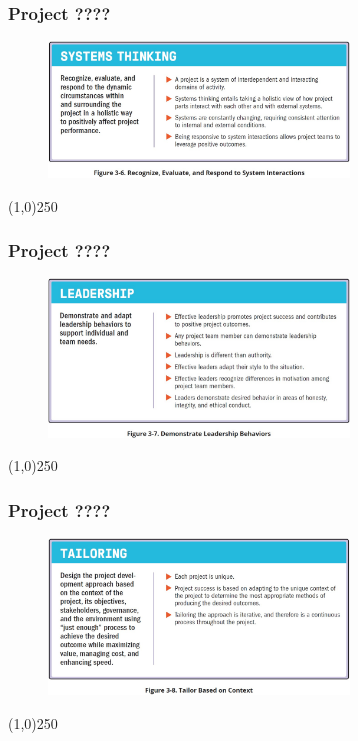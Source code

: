 \begin{frame}
\frametitle{Project ????}
 \begin{figure}
    \centering
        \includegraphics[width = 8cm]{../images/standard/Fig3-6.jpg}
    \label{standardfig:3-6}
 \end{figure}
\end{frame}
\begin{center}\line(1,0){250}\end{center}

\begin{frame}
\frametitle{Project ????}
 \begin{figure}
    \centering
        \includegraphics[width = 8cm]{../images/standard/Fig3-7.jpg}
    \label{standardfig:3-7}
 \end{figure}
\end{frame}
\begin{center}\line(1,0){250}\end{center}



\begin{frame}
\frametitle{Project ????}
 \begin{figure}
    \centering
        \includegraphics[width = 8cm]{../images/standard/Fig3-8.jpg}
    \label{standardfig:3-8}
 \end{figure}
\end{frame}
\begin{center}\line(1,0){250}\end{center}



